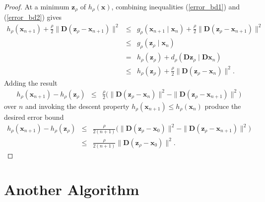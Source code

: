 \documentclass[11pt]{article}
\newcommand{\bx}{\boldsymbol{x}}
\newcommand{\by}{\boldsymbol{y}}
\newcommand{\bz}{\boldsymbol{z}}
\newcommand{\bA}{\boldsymbol{A}}
\newcommand{\bB}{\boldsymbol{B}}
\newcommand{\bC}{\boldsymbol{C}}
\newcommand{\bD}{\boldsymbol{D}}
\begin{document}
\begin{proof}
At a minimum $\bz_\rho$ of $h_\rho(\bx)$, combining inequalities (\ref{error_bd1}) and (\ref{error_bd2}) gives
\begin{eqnarray*}
h_\rho(\bx_{n+1})+\frac{\rho}{2}\|\bD(\bz_\rho-\bx_{n+1})\|^2 & \le &
g_\rho(\bx_{n+1} \mid \bx_n)+\frac{\rho}{2}
\|\bD(\bz_\rho-\bx_{n+1})\|^2 \\
& \le & g_\rho(\bz_\rho \mid \bx_n) \\
& = & h_\rho(\bz_\rho)+d_\rho(\bD\bz_\rho \mid \bD\bx_n) \\
& \le & h_\rho(\bz_\rho)+\frac{\rho}{2}\|\bD(\bz_\rho-\bx_{n})\|^2 .
\end{eqnarray*}
Adding the result 
\begin{eqnarray*}
h_\rho(\bx_{n+1})-h_\rho(\bz_\rho) & \le &
\frac{\rho}{2}\Big(\|\bD(\bz_\rho-\bx_{n})\|^2
 -\|\bD(\bz_\rho-\bx_{n+1})\|^2\Big)
\end{eqnarray*}
over $n$ and invoking the descent property $h_\rho(\bx_{n+1}) \le h_\rho(\bx_n)$ produce the desired error bound
\begin{eqnarray*}
h_\rho(\bx_{n+1})-h_\rho(\bz_\rho) & \le &
\frac{\rho}{2(n+1)} \Big(\|\bD(\bz_\rho-\bx_{0})\|^2 
-\|\bD(\bz_\rho-\bx_{n+1})\|^2\Big) \\
& \le & \frac{\rho}{2(n+1)}\|\bD(\bz_\rho-\bx_{0})\|^2.
\end{eqnarray*}
\end{proof}

\section*{\center Another Algorithm}
\end{document}
